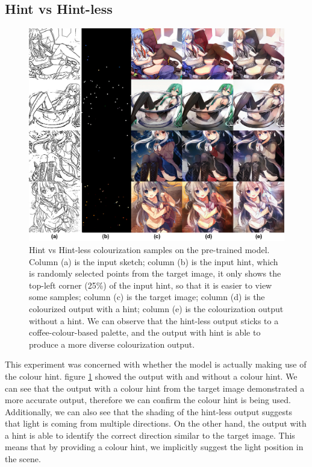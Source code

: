 \subsection{Hint vs Hint-less}
\begin{figure}
    \centering
    \includegraphics[width=1.0\textwidth]{images/colorization/mask_vs_maskless.png}
    \caption[Hint vs Hint-less colourization samples on the pre-trained model.]{Hint vs Hint-less colourization samples on the pre-trained model. Column (a) is the input sketch; column (b) is the input hint, which is randomly selected points from the target image, it only shows the top-left corner (25\%) of the input hint, so that it is easier to view some samples; column (c) is the  target image; column (d) is the colourized output with a hint; column (e) is the colourization output without a hint. We can observe that the hint-less output sticks to a coffee-colour-based palette, and the output with hint is able to produce a more diverse colourization output.}
    \label{fig:mask_vs_maskless}
\end{figure}


This experiment was concerned with whether the model is actually making use of the colour hint. figure \ref{fig:mask_vs_maskless} showed the output with and without a colour hint. We can see that the output with a colour hint from the target image demonstrated a more accurate output, therefore we can confirm the colour hint is being used. Additionally, we can also see that the shading of the hint-less output suggests that light is coming from multiple directions. On the other hand, the output with a hint is able to identify the correct direction similar to the target image. This means that by providing a colour hint, we implicitly suggest the light position in the scene.

